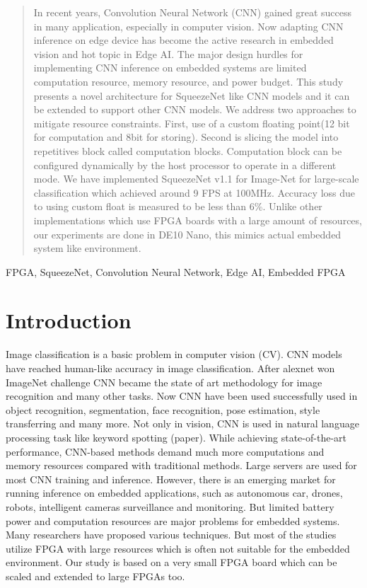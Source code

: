 \documentclass[conference]{IEEEtran}
\begin{document}
\begin{abstract}
In recent years, Convolution Neural Network (CNN) gained great success in many application, especially in computer vision. Now adapting CNN inference on edge device has become the active research in embedded vision and hot topic in Edge AI. The major design hurdles for implementing CNN inference on embedded systems are limited computation resource, memory resource, and power budget. This study presents a novel architecture for SqueezeNet\cite{squeezenet} like CNN models and it can be extended to support other CNN models. We address two approaches to mitigate resource constraints. First, use of a custom floating point(12 bit for computation and 8bit for storing). Second is slicing the model into repetitives block called computation blocks. Computation block can be configured dynamically by the host processor to operate in a different mode. We have implemented SqueezeNet v1.1 for Image-Net\cite{imagenet} for large-scale classification which achieved around 9 FPS at 100MHz. Accuracy loss due to using custom float is measured to be less than 6\%. Unlike other implementations which use FPGA boards with a large amount of resources, our experiments are done in DE10 Nano, this mimics actual embedded system like environment.

\end{abstract}

\begin{IEEEkeywords}
FPGA, SqueezeNet, Convolution Neural Network,  Edge AI,  Embedded FPGA
\end{IEEEkeywords}

\section{Introduction}
Image classification is a basic problem in computer vision (CV). CNN models have reached human-like accuracy in image classification. After alexnet\cite{alexnet} won ImageNet challenge CNN became the state of art methodology for image recognition and many other tasks. Now CNN have been used successfully used in object recognition, segmentation, face recognition, pose estimation, style transferring and many more. Not only in vision, CNN is used in natural language processing task like keyword spotting (paper). While achieving state-of-the-art performance, CNN-based methods demand much more computations and memory resources compared with traditional methods. Large servers are used for most CNN training and inference. However, there is an emerging market for running inference on embedded applications, such as autonomous car, drones, robots, intelligent cameras surveillance and monitoring. But limited battery power and computation resources are major problems for embedded systems. Many researchers have proposed various techniques. But most of the studies utilize FPGA with large resources \cite{zynqnet} which is often not suitable for the embedded environment. Our study is based on a very small FPGA board which can be scaled and extended to large FPGAs too.
\end{document}
